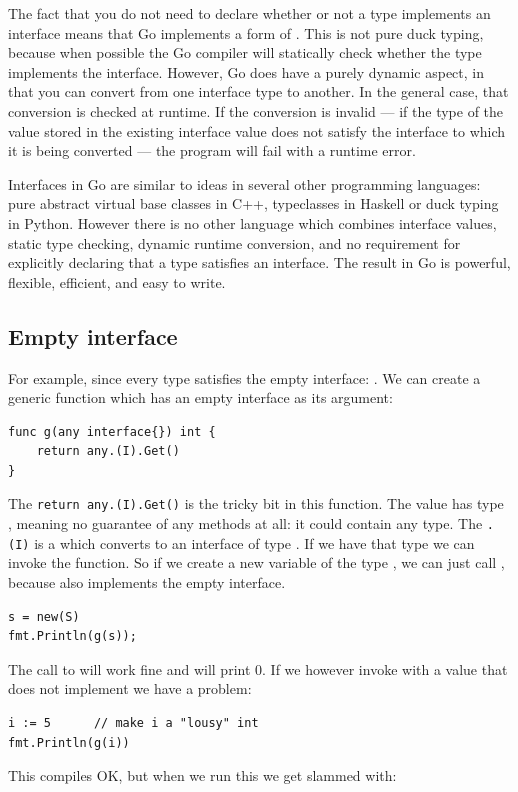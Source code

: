The fact that you do not need to declare whether or not a type implements an
interface means that Go implements a form of 
\cite{duck_typing}. 
This is not
pure duck typing, because when possible the Go compiler will statically
check whether the type implements the interface. However, Go does have a
purely dynamic aspect, in that you can convert from one interface type
to another. In the general case, that conversion is checked at runtime.
If the conversion is invalid --- if the type of the value stored in the
existing interface value does not satisfy the interface to which it is
being converted --- the program will fail with a runtime error.

Interfaces in Go are similar to ideas in several other programming languages:
pure abstract virtual base classes in C++, typeclasses in Haskell or duck typing
in Python. However there is no other language which combines
interface values, static type checking, dynamic runtime conversion, and no
requirement for explicitly declaring that a type satisfies an interface. The
result in Go is powerful, flexible, efficient, and easy to write.


\subsection{Empty interface}
For example, since every type satisfies the empty interface:
. We can create a generic function which 
has an empty interface as its argument:
\begin{lstlisting}[caption=A function with a empty interface argument,label=src:interface empty]
func g(any interface{}) int { 
    return any.(I).Get() 
}
\end{lstlisting}
The \lstinline{return any.(I).Get()} is the tricky bit in this function.
The value  has type , meaning no guarantee
of any methods at all: it could contain any type. The \lstinline{.(I)}
is a  which converts  to an interface of
type . If we have that type we can invoke the 
function.
So if we create a new variable of the type , we can just
call , because  also implements the empty interface.
\begin{lstlisting}
s = new(S)
fmt.Println(g(s));
\end{lstlisting}
The call to  will work fine and will print 0. If we however
invoke  with a value that does not implement  we have
a problem:
\begin{lstlisting}[caption=Failing to implement an interface,label=src:interface fail]
i := 5		// make i a "lousy" int
fmt.Println(g(i))
\end{lstlisting}
This compiles OK, but when we run this we get slammed with:

